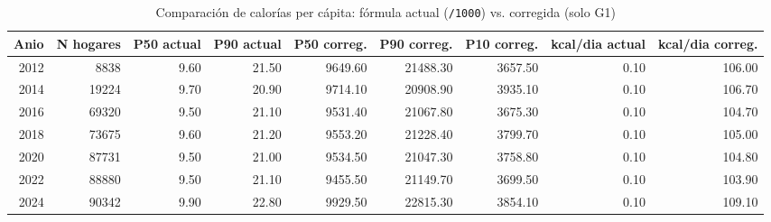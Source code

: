 \begin{table}[ht]
\centering
\caption{Comparaci\'on de calor\'ias per c\'apita: f\'ormula actual (\texttt{/1000}) vs. corregida (solo G1)} 
\label{tab:21_kcal_formula_actual_vs_corregida}
\begin{tabular}{rrrrrrrrr}
  \toprule
Anio & N hogares & P50 actual & P90 actual & P50 correg. & P90 correg. & P10 correg. & kcal/dia actual & kcal/dia correg. \\ 
  \midrule
2012 & 8838 & 9.60 & 21.50 & 9649.60 & 21488.30 & 3657.50 & 0.10 & 106.00 \\ 
  2014 & 19224 & 9.70 & 20.90 & 9714.10 & 20908.90 & 3935.10 & 0.10 & 106.70 \\ 
  2016 & 69320 & 9.50 & 21.10 & 9531.40 & 21067.80 & 3675.30 & 0.10 & 104.70 \\ 
  2018 & 73675 & 9.60 & 21.20 & 9553.20 & 21228.40 & 3799.70 & 0.10 & 105.00 \\ 
  2020 & 87731 & 9.50 & 21.00 & 9534.50 & 21047.30 & 3758.80 & 0.10 & 104.80 \\ 
  2022 & 88880 & 9.50 & 21.10 & 9455.50 & 21149.70 & 3699.50 & 0.10 & 103.90 \\ 
  2024 & 90342 & 9.90 & 22.80 & 9929.50 & 22815.30 & 3854.10 & 0.10 & 109.10 \\ 
   \bottomrule
\end{tabular}
\end{table}
